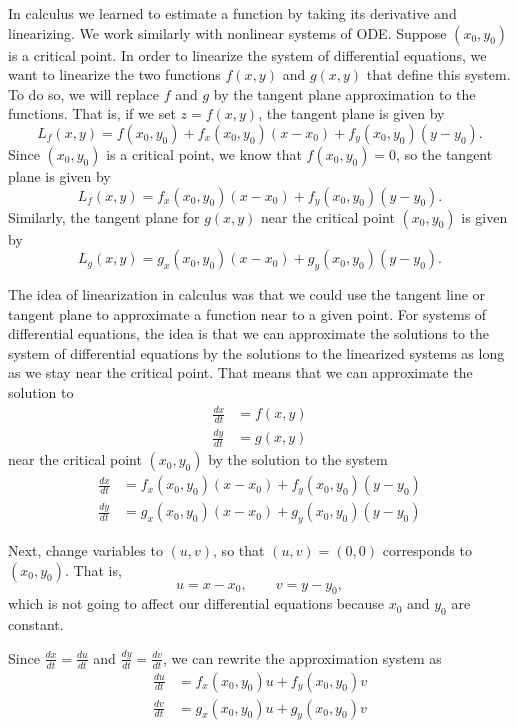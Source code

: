 \documentclass{ximera}
\begin{document}
In calculus we learned to estimate a function by taking its derivative and linearizing.  We work similarly with nonlinear systems of ODE.
Suppose $(x_0,y_0)$ is a critical point. In order to linearize the system of differential equations, we want to linearize the two functions $f(x,y)$ and $g(x,y)$ that define this system. To do so, we will replace $f$ and $g$ by the tangent plane approximation to the functions. That is, if we set $z = f(x,y)$, the tangent plane is given by
\[ 
    L_f(x,y) = f(x_0, y_0) + f_x(x_0, y_0)(x - x_0) + f_y(x_0, y_0)(y - y_0). 
\] 
Since $(x_0, y_0)$ is a critical point, we know that $f(x_0, y_0) = 0$, so the tangent plane is given by 
\[ 
    L_f(x,y) = f_x(x_0, y_0)(x - x_0) + f_y(x_0, y_0)(y - y_0). 
\]
Similarly, the tangent plane for $g(x,y)$ near the critical point $(x_0, y_0)$ is given by 
\[ 
    L_g(x,y) = g_x(x_0, y_0)(x - x_0) + g_y(x_0, y_0)(y - y_0). 
\]

The idea of linearization in calculus was that we could use the tangent line or tangent plane to approximate a function near to a given point. For systems of differential equations, the idea is that we can approximate the solutions to the system of differential equations by the solutions to the linearized systems as long as we stay near the critical point. That means that we can approximate the solution to
\[
    \begin{split}
        \frac{dx}{dt} &= f(x,y) \\
        \frac{dy}{dt} &= g(x,y)
    \end{split}
\]
near the critical point $(x_0, y_0)$ by the solution to the system
\[
    \begin{split}
        \frac{dx}{dt} &= f_x(x_0, y_0)(x - x_0) + f_y(x_0, y_0)(y - y_0) \\
        \frac{dy}{dt} &= g_x(x_0, y_0)(x - x_0) + g_y(x_0, y_0)(y - y_0)
    \end{split}
\]

Next, change variables to $(u,v)$, so that $(u,v)=(0,0)$ corresponds to $(x_0,y_0)$.  That is,
\begin{equation*}
    u=x-x_0, \qquad v=y-y_0,
\end{equation*}
which is not going to affect our differential equations because $x_0$ and $y_0$ are constant. 

Since $\frac{dx}{dt} = \frac{du}{dt}$ and $\frac{dy}{dt} = \frac{dv}{dt}$, we can rewrite the approximation system as 
\[
    \begin{split}
        \frac{du}{dt} &= f_x(x_0, y_0)u + f_y(x_0, y_0)v \\
        \frac{dv}{dt} &= g_x(x_0, y_0)u + g_y(x_0, y_0)v
    \end{split}
\]
\end{document}
